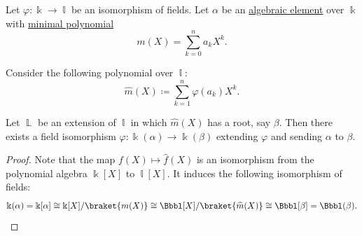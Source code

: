 \begin{lemma}\label{thm:splitting_field_uniqueness_step}
  Let \( \varphi: \Bbbk \to \Bbbl \) be an isomorphism of fields. Let \( \alpha \) be an \hyperref[def:algebraic_element]{algebraic element} over \( \Bbbk \) with \hyperref[def:algebraic_element_minimal_polynomial]{minimal polynomial}
  \begin{equation*}
     m(X) = \sum_{k=0}^n a_k X^k.
  \end{equation*}

  Consider the following polynomial over \( \Bbbl \):
  \begin{equation*}
    \widehat{m}(X) \coloneqq \sum_{k=1}^n \varphi(a_k) X^k.
  \end{equation*}

  Let \( \BbbL \) be an extension of \( \Bbbl \) in which \( \widehat{m}(X) \) has a root, say \( \beta \). Then there exists a field isomorphism \( \varphi: \Bbbk(\alpha) \to \Bbbk(\beta) \) extending \( \varphi \) and sending \( \alpha \) to \( \beta \).
\end{lemma}
\begin{proof}
  Note that the map \( f(X) \mapsto \widehat{f}(X) \) is an isomorphism from the polynomial algebra \( \Bbbk[X] \) to \( \Bbbl[X] \). It induces the following isomorphism of fields:
  \begin{equation*}
    \Bbbk(\alpha) = \Bbbk[\alpha] \cong \Bbbk[X] / \braket{ m(X) } \cong \Bbbl[X] / \braket{ \widehat{m}(X) } \cong \Bbbl[\beta] = \Bbbl(\beta).
  \end{equation*}
\end{proof}

